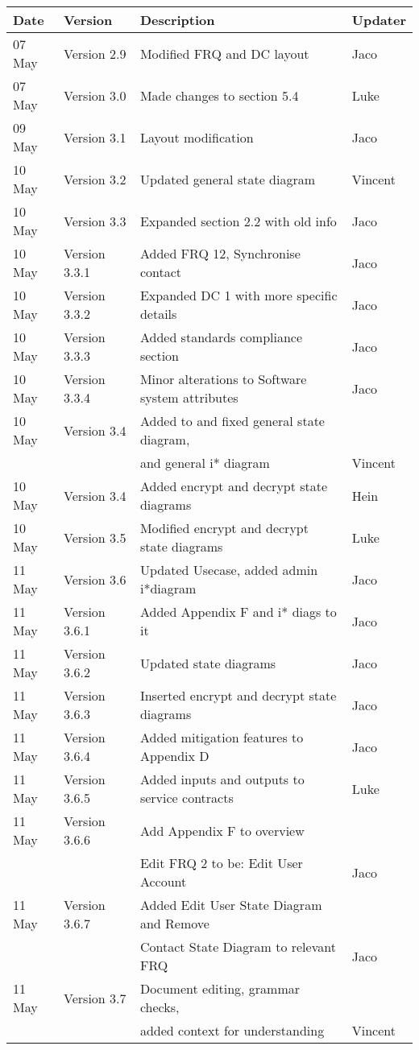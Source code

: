 \begin{center}
\begin{tabular}{|l|l|l|l|}
\hline
\textbf{Date} & \textbf{Version} & \textbf{Description}&\textbf{Updater}\\ 
\hline
07 May & Version 2.9 & Modified FRQ and DC layout & Jaco\\
\hline
07 May & Version 3.0 & Made changes to section 5.4 & Luke\\
\hline
09 May & Version 3.1 & Layout modification & Jaco\\
\hline
10 May & Version 3.2 & Updated general state diagram & Vincent\\
\hline
10 May & Version 3.3 & Expanded section 2.2 with old info& Jaco\\
\hline
10 May & Version 3.3.1 & Added FRQ 12, Synchronise contact& Jaco\\
\hline
10 May & Version 3.3.2 & Expanded DC 1 with more specific details& Jaco\\
\hline
10 May & Version 3.3.3 & Added standards compliance section& Jaco\\
\hline
10 May & Version 3.3.4 & Minor alterations to Software system attributes& Jaco\\
\hline
10 May & Version 3.4 & Added to and fixed general state diagram,&\\
&& and general i* diagram & Vincent\\
\hline
10 May & Version 3.4 & Added encrypt and decrypt state diagrams & Hein\\
\hline
10 May & Version 3.5 & Modified encrypt and decrypt state diagrams & Luke\\
\hline
11 May & Version 3.6 & Updated Usecase, added admin i*diagram& Jaco\\
\hline
11 May & Version 3.6.1 & Added Appendix F and i* diags to it &Jaco\\
\hline
11 May & Version 3.6.2 & Updated state diagrams &Jaco\\
\hline
11 May & Version 3.6.3 & Inserted encrypt and decrypt state diagrams&Jaco\\
\hline
11 May & Version 3.6.4 & Added mitigation features to Appendix D&Jaco\\
\hline
11 May & Version 3.6.5 & Added inputs and outputs to service contracts&Luke\\
\hline
11 May & Version 3.6.6 & Add Appendix F to overview&\\
 &  &Edit FRQ 2 to be:  Edit User Account &Jaco\\
\hline
11 May & Version 3.6.7 & Added Edit User State Diagram and Remove&\\
&& Contact State Diagram to relevant FRQ&Jaco\\
\hline
11 May & Version 3.7 & Document editing, grammar checks, &\\
&&added context for understanding & Vincent\\
\hline
\end{tabular}


\end{center}
